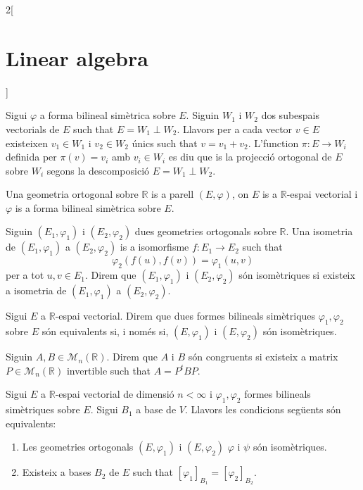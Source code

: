 \documentclass[../../../main.tex]{subfiles}
\begin{document}
\begin{multicols}{2}[\section{Linear algebra}]
\begin{definition}
\end{definition}
\begin{definition}
Sigui $\varphi$ a forma bilineal simètrica sobre $E$. Siguin $W_1$ i $W_2$ dos subespais vectorials de $E$ such that $E=W_1\perp W_2$. Llavors per a cada vector $v\in E$ existeixen $v_1\in W_1$ i $v_2\in W_2$ únics such that $v=v_1+v_2$. L'function $\pi:E\rightarrow W_i$ definida per $\pi(v)=v_i$ amb $v_i\in W_i$ es diu que is la projecció ortogonal de $E$ sobre $W_i$ segons la descomposició $E=W_1\perp W_2$.
\label{perpendicular}
\end{definition}
\begin{definition}
Una geometria ortogonal sobre $\mathbb{R}$ is a parell $(E,\varphi)$, on $E$ is a $\mathbb{R}$-espai vectorial i $\varphi$ is a forma bilineal simètrica sobre $E$.
\end{definition}
\begin{definition}
Siguin $(E_1,\varphi_1)$ i $(E_2,\varphi_2)$ dues geometries ortogonals sobre $\mathbb{R}$. Una isometria de $(E_1,\varphi_1)$ a $(E_2,\varphi_2)$ is a isomorfisme $f:E_1\rightarrow E_2$ such that $$\varphi_2(f(u),f(v))=\varphi_1(u,v)$$ per a tot $u,v\in E_1$. Direm que $(E_1,\varphi_1)$ i $(E_2,\varphi_2)$ són isomètriques si existeix a isometria de $(E_1,\varphi_1)$ a $(E_2,\varphi_2)$.
\label{isometry}
\end{definition}
\begin{definition}
Sigui $E$ a $\mathbb{R}$-espai vectorial. Direm que dues formes bilineals simètriques $\varphi_1,\varphi_2$ sobre $E$ són equivalents si, i només si, $(E,\varphi_1)$ i $(E,\varphi_2)$ són isomètriques.
\end{definition}
\begin{definition}
Siguin $A,B\in\mathcal{M}_n(\mathbb{R})$. Direm que $A$ i $B$ són congruents si existeix a matrix $P\in\mathcal{M}_n(\mathbb{R})$ invertible such that $A=P^tBP$.
\end{definition}
\begin{prop}
Sigui $E$ a $\mathbb{R}$-espai vectorial de dimensió $n<\infty$ i $\varphi_1,\varphi_2$ formes bilineals simètriques sobre $E$. Sigui $B_1$ a base de $V$. Llavors les condicions següents són equivalents:
\begin{enumerate}
    \item Les geometries ortogonals $(E,\varphi_1)$ i $(E,\varphi_2)$ $\varphi$ i $\psi$ són isomètriques.
    \item Existeix a bases $B_2$ de $E$ such that $[\varphi_1]_{B_1}=[\varphi_2]_{B_2}$.

\end{enumerate}
\end{prop}
\end{multicols}
\end{document}
